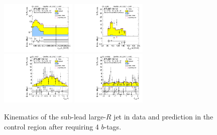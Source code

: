 \begin{figure}[htbp!]
\begin{center}
\includegraphics[width=0.32\textwidth,angle=-90]{figures/boosted/Control/b77_FourTag_Control_sublHCand_Pt_m_1.pdf}
\includegraphics[width=0.32\textwidth,angle=-90]{figures/boosted/Control/b77_FourTag_Control_sublHCand_Mass_s.pdf}\\
\includegraphics[width=0.32\textwidth,angle=-90]{figures/boosted/Control/b77_FourTag_Control_sublHCand_Eta.pdf}
\includegraphics[width=0.32\textwidth,angle=-90]{figures/boosted/Control/b77_FourTag_Control_sublHCand_Phi.pdf}
  \caption{Kinematics of the sub-lead large-$R$ jet in data and prediction in the control region after requiring 4 $b$-tags. }
  \label{fig:boosted-4b-control-ak10-subl}
\end{center}
\end{figure}

